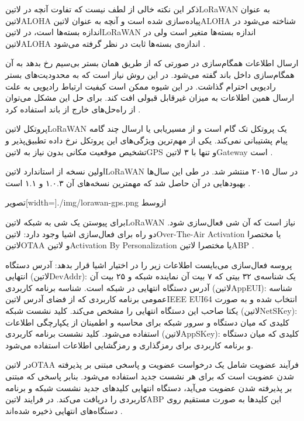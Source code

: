 ذکر این نکته خالی از لطف نیست که تفاوت آنچه در ‌لاتین{LoRaWAN} به عنوان ‌لاتین{ALOHA} پیاده‌سازی شده است و آنچه به عنوان ‌لاتین{ALOHA} شناخته می‌شود در اندازه بسته‌ها است،
در ‌لاتین{LoRaWAN} اندازه بسته‌ها متغیر است ولی در ‌لاتین{ALOHA} اندازه‌ی بسته‌ها ثابت در نظر گرفته می‌شود
.

ارسال اطلاعات همگام‌سازی در صورتی که از طریق همان بستر بی‌سیم رخ بدهد به آن همگام‌سازی داخل باند گفته می‌شود. در این روش نیاز است که به محدودیت‌های بستر رادیویی احترام گذاشت.
در این شیوه ممکن است کیفیت ارتباط رادیویی به علت ارسال همین اطلاعات به میزان غیرقابل قبولی افت کند. برای حل این مشکل می‌توان از راه‌حل‌های خارج از باند استفاده کرد
.

پروتکل ‌لاتین{LoRaWAN} یک پروتکل تک گام است و از مسیریابی یا ارسال چند گامه پیام پشتیبانی نمی‌کند. یکی از مهم‌ترین ویژگی‌های این پروتکل نرخ داده تطبیق‌پذیر و تشخیص
موقعیت مکانی بدون نیاز به ‌لاتین{GPS} و تنها با ۳ ‌لاتین{Gateway} است
.

اولین نسخه از استاندارد ‌لاتین{LoRaWAN} در سال ۲۰۱۵ منتشر شد. در طی این سال‌ها بهبودهایی در آن حاصل شد که مهمترین نسخه‌های آن ۱.۰.۳ و ۱.۱ است
.

‌تصویر[width=\textwidth]{./img/lorawan-gps.png}
‌ازوسط

برای پیوستن یک شی به شبکه ‌لاتین{LoRaWAN} نیاز است که آن شی فعال‌سازی شود. دو راه برای فعال‌سازی اشیا وجود دارد: ‌لاتین{Over-The-Air Activation} یا مختصرا ‌لاتین{OTAA}
و ‌لاتین{Activation By Personalization} یا مختصرا ‌لاتین{ABP}
.

پروسه فعال‌سازی می‌بایست اطلاعات زیر را در اختیار اشیا قرار بدهد:
 آدرس دستگاه انتهایی (‌لاتین{DevAddr}): یک شناسه‌ی ۳۲ بیتی که ۷ بیت آن نماینده شبکه و ۲۵ بیت آن آدرس دستگاه انتهایی در شبکه است.
 شناسه برنامه کاربردی (‌لاتین{AppEUI}): شناسه عمومی برنامه کاربردی که از فضای آدرس ‌لاتین{IEEE EUI64} انتخاب شده و به صورت یکتا صاحب این دستگاه انتهایی را مشخص می‌کند.
 کلید نشست شبکه (‌لاتین{NetSKey}): کلیدی که میان دستگاه و سرور شبکه برای محاسبه و اطمینان از یکپارچگی اطلاعات استفاده می‌شود.
 کلید نشست برنامه کاربردی (‌لاتین{AppSKey}): کلیدی که میان دستگاه و برنامه کاربردی برای رمزگذاری و رمزگشایی اطلاعات استفاده می‌شود.

در ‌لاتین{OTAA} فرآیند عضویت شامل یک درخواست عضویت و پاسخی مبتنی بر پذیرفته شدن عضویت است که برای هر نشست جدید استفاده می‌شود.
بنابر پاسخی که مبتنی بر پذیرفته شدن عضویت می‌آید، دستگاه انتهایی کلیدهای جدید نشست شبکه و برنامه کاربردی را دریافت می‌کند.
در فرایند ‌لاتین{ABP} این کلیدها به صورت مستقیم روی دستگاه‌های انتهایی ذخیره شده‌اند
.

